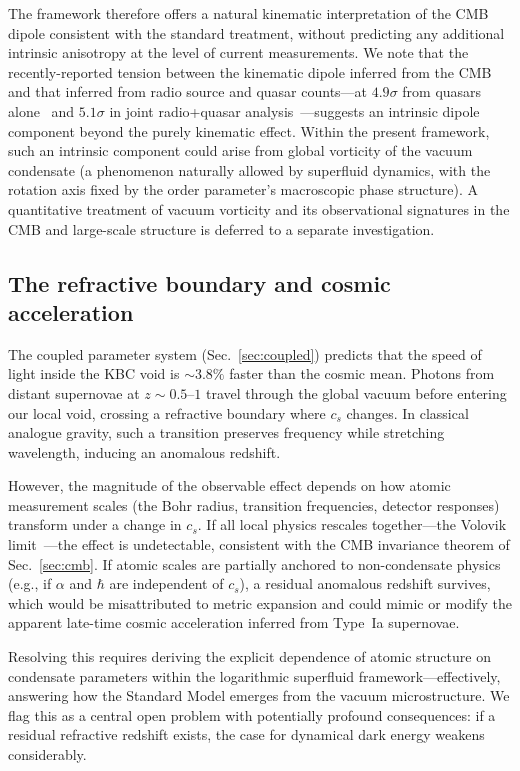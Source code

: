 \documentclass[12pt, a4paper]{article}
\begin{document}
The framework therefore offers a natural kinematic interpretation of the CMB dipole consistent with the standard treatment, without predicting any additional intrinsic anisotropy at the level of current measurements. We note that the recently-reported tension between the kinematic dipole inferred from the CMB and that inferred from radio source and quasar counts---at $4.9\sigma$ from quasars alone~\cite{secrest_2021} and $5.1\sigma$ in joint radio+quasar analysis~\cite{secrest_2022}---suggests an intrinsic dipole component beyond the purely kinematic effect. Within the present framework, such an intrinsic component could arise from global vorticity of the vacuum condensate (a phenomenon naturally allowed by superfluid dynamics, with the rotation axis fixed by the order parameter's macroscopic phase structure). A quantitative treatment of vacuum vorticity and its observational signatures in the CMB and large-scale structure is deferred to a separate investigation.

\subsection{The refractive boundary and cosmic acceleration}
\label{sec:refractive}

The coupled parameter system (Sec.~\ref{sec:coupled}) predicts that the speed of light inside the KBC void is $\sim 3.8\%$ faster than the cosmic mean. Photons from distant supernovae at $z \sim 0.5$--$1$ travel through the global vacuum before entering our local void, crossing a refractive boundary where $c_s$ changes. In classical analogue gravity, such a transition preserves frequency while stretching
wavelength, inducing an anomalous redshift.

However, the magnitude of the observable effect depends on how atomic measurement scales (the Bohr radius, transition frequencies, detector responses) transform under a change in $c_s$. If all local physics rescales together---the Volovik limit~\cite{volovik_2003}---the effect is undetectable, consistent with the CMB invariance theorem of Sec.~\ref{sec:cmb}. If atomic scales are partially anchored to non-condensate physics (e.g., if $\alpha$ and $\hbar$ are independent of $c_s$), a residual anomalous redshift survives, which would be misattributed to metric expansion and could mimic or modify the apparent late-time cosmic acceleration inferred from Type~Ia supernovae.

Resolving this requires deriving the explicit dependence of atomic structure on condensate parameters within the logarithmic superfluid framework---effectively, answering how the Standard Model emerges from the vacuum microstructure. We flag this as a central open problem with potentially profound consequences: if a residual refractive redshift exists, the case for dynamical dark energy weakens considerably.
\end{document}
